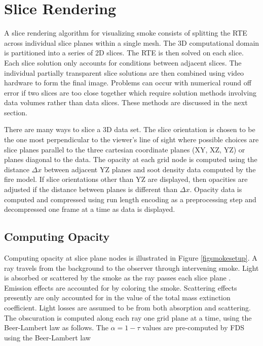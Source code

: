 {\section{Slice Rendering}
A slice rendering algorithm for visualizing smoke consists of splitting the RTE across individual slice planes within a single mesh.  The 3D computational domain is partitioned into a series of 2D slices.  The RTE is then solved on each slice.  Each slice solution only accounts for conditions between adjacent slices.  The individual partially transparent slice solutions are then combined using video hardware to form the final image.   Problems can occur with numerical round off error if two slices are too close together which require solution methods  involving data volumes rather than data slices. These methods are discussed in the next section.

There are many ways to slice a 3D data set.  The slice orientation is chosen to be the one most perpendicular to the viewer's line of sight where possible choices are slice planes parallel to the three cartesian coordinate planes (XY, XZ, YZ) or planes diagonal to the data.  The opacity at each grid node is computed using the distance $\Delta x$ between adjacent YZ planes and soot density data computed by the fire model.  If slice orientations other than YZ are displayed, then opacities are adjusted if the distance between planes is different than $\Delta x$.  Opacity data is computed and compressed using run length encoding as a preprocessing step and decompressed one frame at a time as data is displayed.


\subsection{Computing Opacity}
Computing opacity at slice plane nodes is illustrated in Figure
\ref{figsmokesetup}. A ray travels from the background to the
observer through intervening smoke. Light is absorbed or scattered
by the smoke as the ray passes each slice plane . Emission effects
are accounted for by coloring the smoke.  Scattering effects
presently are only accounted for in the value of the total mass
extinction coefficient.  Light losses are assumed to be from both
absorption and scattering. The obscuration is computed along each
ray one grid plane at a time, using the Beer-Lambert law as
follows.  The $\alpha=1-\tau$ values are pre-computed by FDS using
the Beer-Lambert law~\cite{Siegel:2001}

}
